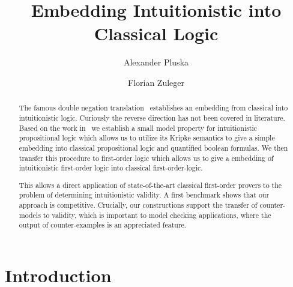 \documentclass[runningheads]{llncs}
\begin{document}
	\title{Embedding Intuitionistic into Classical Logic}
	\author{Alexander Pluska \and Florian Zuleger}
	\maketitle
\begin{abstract}
The famous double negation translation~\cite{glivenko1929quelques,godel1933intuitionistischen} establishes an embedding from classical into intuitionistic logic. Curiously the reverse direction has not been covered in literature. Based on the work in~\cite{claessen2015sat} we establish a small model property for intuitionistic propositional logic which allows us to utilize its Kripke semantics to give a simple embedding into classical propositional logic and quantified boolean formulas. We then transfer this procedure to first-order logic which allows us to give a embedding of intuitionistic first-order logic into classical first-order-logic.


This allows a direct application of state-of-the-art classical first-order provers to the problem of determining intuitionistic validity. A first benchmark shows that our approach is competitive. Crucially, our constructions support the transfer of counter-models to validity, which is important to model checking applications, where the output of counter-examples is an appreciated feature.
\end{abstract}

\section{Introduction}
\end{document}
